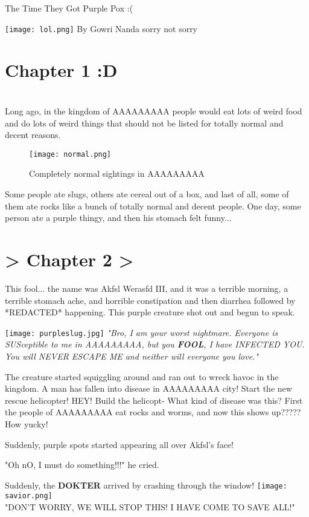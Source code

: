 \documentclass[20pt]{article}
\begin{document}
\Huge{\centerline{The Time They Got Purple Pox :(}}
\author{By: Gowri Nanda }
\date{July 2022}
\texttt{[image: lol.png]}
\Large{By Gowri Nanda}
\small{sorry not sorry}


\newpage


\section{\Huge{Chapter 1 :D}}
\\
\Large{{\selectfont
Long ago, in the kingdom of AAAAAAAAA people would eat lots of 
weird food and do lots of weird things that should not be listed for totally normal and decent reasons. }}

\begin{figure}[h!]
  \caption{Completely normal sightings in AAAAAAAAA}
  \texttt{[image: normal.png]}
\end{figure}


Some people ate slugs, others ate cereal out of a box, and last of all, 
some of them ate rocks like a bunch of totally normal and decent people. 
One day, some person ate a purple thingy, and then his stomach felt funny...
\newpage


\section{\Huge{> Chapter 2 >}}
\large{{\selectfont
This fool... the name was Akfsl Werasfd III, and it was a terrible morning, a terrible stomach ache, and horrible constipation and then diarrhea followed by *REDACTED* happening. This purple creature shot out and begun to speak.}}

\texttt{[image: purpleslug.jpg]}
\textit{"Bro, I am your worst nightmare. Everyone is SUSceptible to me in AAAAAAAAA, but you\textbf{ FOOL}, I have INFECTED YOU. You will NEVER ESCAPE ME and neither will everyone you love."}
\hspace{1cm}

\large{{\selectfont
The creature started squiggling around and ran out to wreck havoc in the kingdom. A man has fallen into disease in AAAAAAAAA city! Start the new rescue helicopter! HEY! Build the helicopt-
What kind of disease was this? First the people of AAAAAAAAA eat rocks and worms, and now this shows up????? How yucky!

\hspace{1cm}
Suddenly, purple spots started appearing all over Akfsl's face!

"Oh nO, I must do something!!!" he cried.

Suddenly, the \textbf{DOKTER} arrived by crashing through the window!
\texttt{[image: savior.png]}
\\
"DON'T WORRY, WE WILL STOP THIS! I HAVE COME TO SAVE ALL!"
}}
\end{document}
